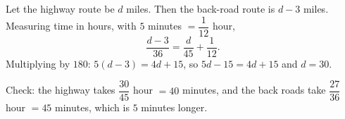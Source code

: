 Let the highway route be $d$ miles. Then the back-road route is $d-3$ miles. Measuring time in hours, with $5$ minutes $=\dfrac{1}{12}$ hour,
\[\dfrac{d-3}{36}=\dfrac{d}{45}+\dfrac{1}{12}.\]
Multiplying by $180$: $5(d-3)=4d+15$, so $5d-15=4d+15$ and $d=\boxed{30}$.

Check: the highway takes $\dfrac{30}{45}$ hour $=40$ minutes, and the back roads take $\dfrac{27}{36}$ hour $=45$ minutes, which is $5$ minutes longer.

